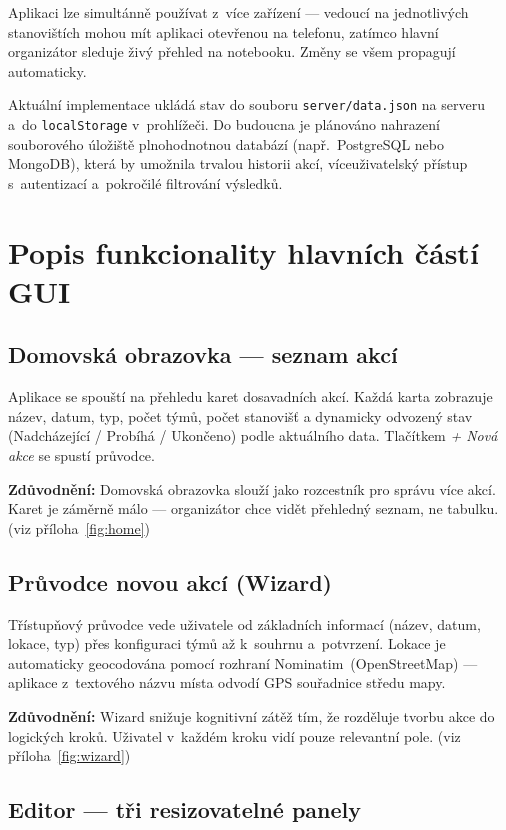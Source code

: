 ﻿\documentclass[a4paper,12pt]{article}
\begin{document}
Aplikaci lze simultánně používat z~více zařízení — vedoucí na jednotlivých
stanovištích mohou mít aplikaci otevřenou na telefonu, zatímco hlavní
organizátor sleduje živý přehled na notebooku. Změny se všem propagují
automaticky.

Aktuální implementace ukládá stav do souboru \texttt{server/data.json} na
serveru a~do \texttt{localStorage} v~prohlížeči. Do budoucna je plánováno
nahrazení souborového úložiště plnohodnotnou databází (např.\ PostgreSQL nebo
MongoDB), která by umožnila trvalou historii akcí, víceuživatelský přístup
s~autentizací a~pokročilé filtrování výsledků.

\section{Popis funkcionality hlavních částí GUI}

\subsection{Domovská obrazovka — seznam akcí}

Aplikace se spouští na přehledu karet dosavadních akcí. Každá karta zobrazuje
název, datum, typ, počet týmů, počet stanovišť a dynamicky odvozený stav
(Nadcházející / Probíhá / Ukončeno) podle aktuálního data. Tlačítkem
\emph{+ Nová akce} se spustí průvodce.

\textbf{Zdůvodnění:} Domovská obrazovka slouží jako rozcestník pro správu
více akcí. Karet je záměrně málo — organizátor chce vidět přehledný seznam,
ne tabulku. (viz příloha~\ref{fig:home})

\subsection{Průvodce novou akcí (Wizard)}

Třístupňový průvodce vede uživatele od základních informací (název, datum,
lokace, typ) přes konfiguraci týmů až k~souhrnu a~potvrzení. Lokace je
automaticky geocodována pomocí rozhraní Nominatim~(OpenStreetMap) — aplikace
z~textového názvu místa odvodí GPS souřadnice středu mapy.

\textbf{Zdůvodnění:} Wizard snižuje kognitivní zátěž tím, že rozděluje
tvorbu akce do logických kroků. Uživatel v~každém kroku vidí pouze relevantní
pole. (viz příloha~\ref{fig:wizard})

\subsection{Editor — tři resizovatelné panely}
\end{document}
